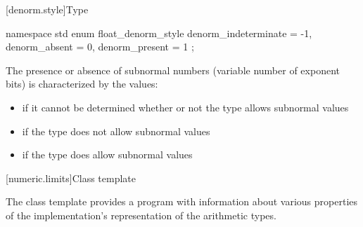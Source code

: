 [denorm.style]{Type }

%
\begin{codeblock}
namespace std {
  enum float_denorm_style {
    denorm_indeterminate = -1,
    denorm_absent = 0,
    denorm_present = 1
  };
}
\end{codeblock}

%
%
%
%
\pnum
The presence or absence of subnormal numbers (variable number of exponent bits)
is characterized by the values:

\begin{itemize}
\item
{}%
if it cannot be determined whether or not the type allows subnormal values
\item
{}%
if the type does not allow subnormal values
\item
{}%
if the type does allow subnormal values
\end{itemize}

[numeric.limits]{Class template }

\pnum
The
%
class template provides a \Cpp{} program with information about various properties of
the implementation's representation of the
arithmetic types.

